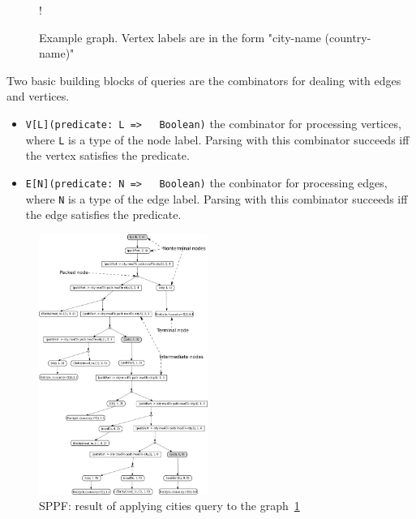 
\begin{figure}[h]
 {!}
{
}
\caption{Example graph. Vertex labels are in the form "city-name (country-name)"}
\label{fig:graph}
\end{figure}

Two basic building blocks of queries are the combinators for dealing with edges and vertices.
\begin{itemize}
    \item \lstinline{V[L](predicate: L =>   Boolean)} the combinator for processing vertices, where \lstinline{L} is a type of the node label. 
    Parsing with this combinator succeeds iff the vertex satisfies the predicate.
    \item \lstinline{E[N](predicate: N =>   Boolean)} the conbinator for processing edges, where \lstinline{N} is a type of the edge label. 
    Parsing with this combinator succeeds iff the edge satisfies the predicate.  
\end{itemize}

\begin{figure}[h]
\includegraphics[width=0.49\textwidth]{sppf}
\caption{SPPF: result of applying cities query to the graph~\ref{fig:graph}}
\label{fig:sppf}
\end{figure}

